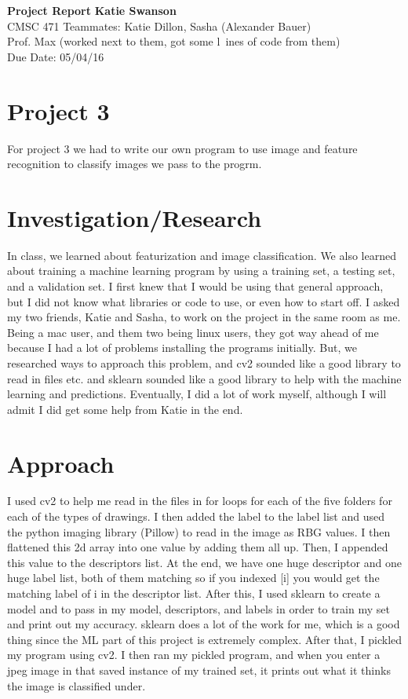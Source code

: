 \documentclass[a4paper, 11pt]{article}
\begin{document}
\noindent
\large\textbf{Project Report} \hfill \textbf{Katie Swanson} \\
\normalsize CMSC 471 \hfill Teammates: Katie Dillon, Sasha (Alexander Bauer)\\
Prof. Max \hfill (worked next to them, got some l\
ines of code from them) \\
 \hfill Due Date: 05/04/16

\section*{Project 3}
For project 3 we had to write our own program to use image and feature recognition to classify images we pass to the progrm.

\section*{Investigation/Research}
In class, we learned about featurization and image classification. We also learned about training a machine learning program by using a training set, a testing set, and a validation set. I first knew that I would be using that general approach, but I did not know what libraries or code to use, or even how to start off. I asked my two friends, Katie and Sasha, to work on the project in the same room as me. Being a mac user, and them two being linux users, they got way ahead of me because I had a lot of problems installing the programs initially. But, we researched ways to approach this problem, and cv2 sounded like a good library to read in files etc. and sklearn sounded like a good library to help with the machine learning and predictions. Eventually, I did a lot of work myself, although I will admit I did get some help from Katie in the end.

\section*{Approach}
I used cv2 to help me read in the files in for loops for each of the five folders for each of the types of drawings. I then added the label to the label list and used the python imaging library (Pillow) to read in the image as RBG values. I then flattened this 2d array into one value by adding them all up. Then, I appended this value to the descriptors list. At the end, we have one huge descriptor and one huge label list, both of them matching so if you indexed [i] you would get the matching label of i in the descriptor list. After this, I used sklearn to create a model and to pass in my model, descriptors, and labels in order to train my set and print out my accuracy. sklearn does a lot of the work for me, which is a good thing since the ML part of this project is extremely complex. After that, I pickled my program using cv2. I then ran my pickled program, and when you enter a jpeg image in that saved instance of my trained set, it prints out what it thinks the image is classified under.
\end{document}
